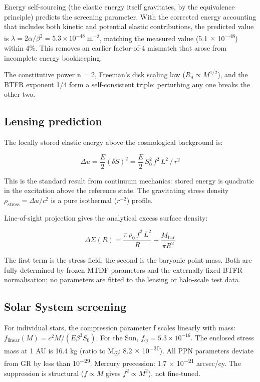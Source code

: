 \documentclass[11pt,a4paper]{article}
\begin{document}
Energy self-sourcing (the elastic energy itself gravitates, by the equivalence principle) predicts the screening parameter. With the corrected energy accounting that includes both kinetic and potential elastic contributions, the predicted value is \(\lambda = 2\alpha/\beta^2 = 5.3 \times 10^{-48}\;\mathrm{m}^{-2}\), matching the measured value (5.1 $\times$ 10\textsuperscript{$-$48}) within 4\%. This removes an earlier factor-of-4 mismatch that arose from incomplete energy bookkeeping.

The constitutive power n = 2, Freeman's disk scaling law (\(R_d \propto M^{1/2}\)), and the BTFR exponent 1/\allowbreak{}4 form a self-consistent triple: perturbing any one breaks the other two.

\subsection{Lensing prediction}
The locally stored elastic energy above the cosmological background is:

\[ \Delta u = \frac{E}{2}(\delta S)^2 = \frac{E}{2}\,S_0^2\,f^2\,L^2\,/\,r^2 \]

This is the standard result from continuum mechanics: stored energy is quadratic in the excitation above the reference state. The gravitating stress density \(\rho_{\mathrm{stress}} = \Delta u / c^2\) is a pure isothermal (\(r^{-2}\)) profile.

Line-of-sight projection gives the analytical excess surface density:

\[ \Delta\Sigma(R) = \frac{\pi\,\rho_0\,f^2\,L^2}{R} + \frac{M_{\mathrm{bar}}}{\pi R^2} \]

The first term is the stress field; the second is the baryonic point mass. Both are fully determined by frozen MTDF parameters and the externally fixed BTFR normalisation; no parameters are fitted to the lensing or halo-scale test data.

\subsection{Solar System screening}
For individual stars, the compression parameter f scales linearly with mass: \(f_{\mathrm{linear}}(M) = c^2 M / (E\beta^3 S_0)\). For the Sun, \(f_\odot = 5.3 \times 10^{-16}\). The enclosed stress mass at 1 AU is 16.4 kg (ratio to M\textsubscript{$\odot$}: 8.2 $\times$ 10\textsuperscript{$-$30}). All PPN parameters deviate from GR by less than 10\textsuperscript{$-$29}. Mercury precession: 1.7 $\times$ 10\textsuperscript{$-$21} arcsec/\allowbreak{}cy. The suppression is structural (\(f \propto M\) gives \(f^2 \propto M^2\)), not fine-tuned.
\end{document}

